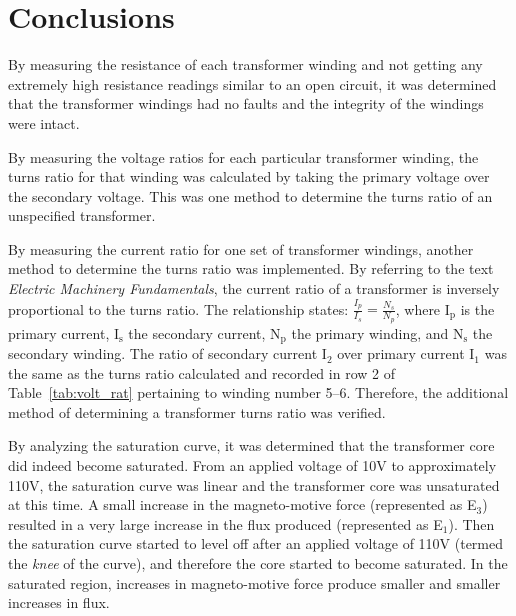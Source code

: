 \documentclass{article}
\begin{document}
\section{Conclusions}

By measuring the resistance of each transformer winding and not getting any
extremely high resistance readings similar to an open circuit, it was
determined that the transformer windings had no faults and the integrity of the
windings were intact.

By measuring the voltage ratios for each particular transformer winding, the
turns ratio for that winding was calculated by taking the primary voltage over
the secondary voltage. This was one method to determine the turns ratio of an
unspecified transformer.

By measuring the current ratio for one set of transformer windings, another
method to determine the turns ratio was implemented. By referring to the text
\emph{Electric Machinery Fundamentals}, the current ratio of a transformer is
inversely proportional to the turns ratio. The relationship states:
$\frac{I_p}{I_s} = \frac{N_s}{N_p}$, where I$_\text{p}$ is the primary current,
I$_\text{s}$ the secondary current, N$_\text{p}$ the primary winding, and
N$_\text{s}$ the secondary winding.  The ratio of secondary current I$_2$ over
primary current I$_1$ was the same as the turns ratio calculated and recorded
in row 2 of Table~\ref{tab:volt_rat} pertaining to winding number 5--6.
Therefore, the additional method of determining a transformer turns ratio was
verified.

By analyzing the saturation curve, it was determined that the transformer core
did indeed become saturated.  From an applied voltage of 10V to approximately
110V, the saturation curve was linear and the transformer core was unsaturated
at this time. A small increase in the magneto-motive force (represented as
E$_3$) resulted in a very large increase in the flux produced (represented as
E$_1$).  Then the saturation curve started to level off after an applied
voltage of 110V (termed the \emph{knee} of the curve), and therefore the core
started to become saturated. In the saturated region, increases in
magneto-motive force produce smaller and smaller increases in flux.
\end{document}
